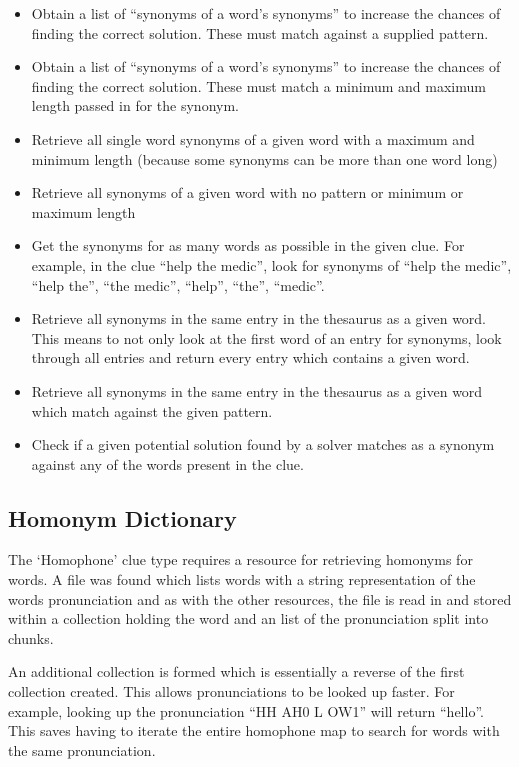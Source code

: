 \begin{itemize}
  \item Obtain a list of ``synonyms of a word's synonyms'' to increase the 
        chances of finding the correct solution. These must match against a 
        supplied pattern. 
  \item Obtain a list of ``synonyms of a word's synonyms'' to increase the 
        chances of finding the correct solution. These must match a minimum and
        maximum length passed in for the synonym.
  \item Retrieve all single word synonyms of a given word with a maximum and 
        minimum length (because some synonyms can be more than one word long) 
  \item Retrieve all synonyms of a given word with no pattern or minimum or 
        maximum length
  \item Get the synonyms for as many words as possible in the given clue. For 
        example, in the clue ``help the medic'', look for synonyms of ``help the
        medic'', ``help the'', ``the medic'', ``help'', ``the'', ``medic''.
  \item Retrieve all synonyms in the same entry in the thesaurus as a given 
        word. This means to not only look at the first word of an entry for 
        synonyms, look through all entries and return every entry which contains
        a given word.
  \item Retrieve all synonyms in the same entry in the thesaurus as a given word
        which match against the given pattern.
  \item Check if a given potential solution found by a solver matches as a 
        synonym against any of the words present in the clue.
\end{itemize}


\subsection{Homonym Dictionary}

The `Homophone' clue type requires a resource for retrieving homonyms for words.
A file was found which lists words with a string representation of the words
pronunciation  and as with the other resources, the file is read in and stored
within a collection holding  the word and an list of the pronunciation split
into chunks. 

An additional collection  is formed which is essentially a reverse of the first
collection created. This allows pronunciations  to be looked up faster. For
example, looking up the pronunciation ``HH AH0 L OW1'' will return  ``hello''.
This saves having to iterate the entire homophone map to search for words with
the same pronunciation.

